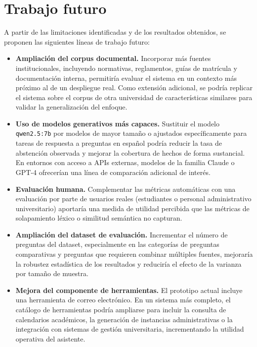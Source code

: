 \section{Trabajo futuro}\label{sec:trabajo-futuro}

A partir de las limitaciones identificadas y de los resultados obtenidos, se proponen las siguientes líneas de trabajo futuro:

\begin{itemize}
    \item \textbf{Ampliación del corpus documental.} Incorporar más fuentes institucionales, incluyendo normativas, reglamentos, guías de matrícula y documentación interna, permitiría evaluar el sistema en un contexto más próximo al de un despliegue real. 
    Como extensión adicional, se podría replicar el sistema sobre el corpus de otra universidad de características similares para validar la generalización del enfoque.

    \item \textbf{Uso de modelos generativos más capaces.} Sustituir el modelo \texttt{qwen2.5:7b} por modelos de mayor tamaño o ajustados específicamente para tareas de respuesta a preguntas en español podría reducir la tasa de abstención observada y mejorar la cobertura de hechos de forma sustancial. 
    En entornos con acceso a APIs externas, modelos de la familia Claude o GPT-4 ofrecerían una línea de comparación adicional de interés.

    \item \textbf{Evaluación humana.} Complementar las métricas automáticas con una evaluación por parte de usuarios reales (estudiantes o personal administrativo universitario) aportaría una medida de utilidad percibida que las métricas de solapamiento léxico o similitud semántica no capturan.

    \item \textbf{Ampliación del dataset de evaluación.} Incrementar el número de preguntas del dataset, especialmente en las categorías de preguntas comparativas y preguntas que requieren combinar múltiples fuentes, mejoraría la robustez estadística de los resultados y reduciría el efecto de la varianza por tamaño de muestra.

    \item \textbf{Mejora del componente de herramientas.} El prototipo actual incluye una herramienta de correo electrónico. 
    En un sistema más completo, el catálogo de herramientas podría ampliarse para incluir la consulta de calendarios académicos, la generación de instancias administrativas o la integración con sistemas de gestión universitaria, incrementando la utilidad operativa del asistente.


\end{itemize}
